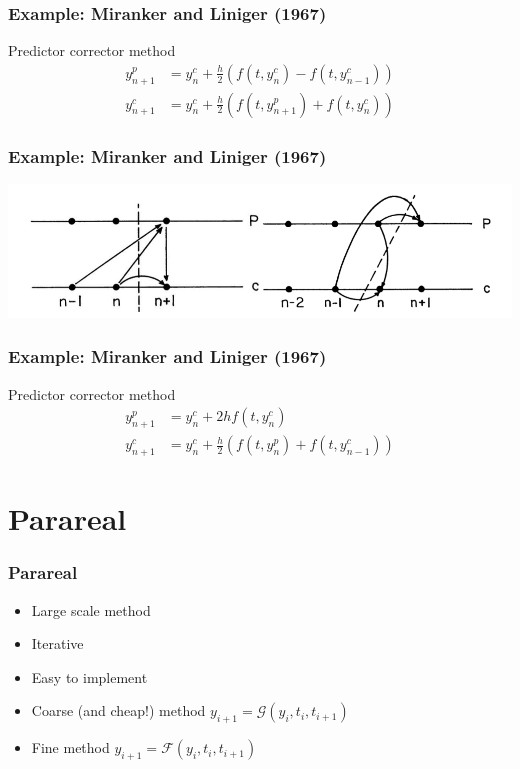 \documentclass[aspectratio=169]{beamer}
\begin{document}
    \begin{frame}
        \frametitle{Example: Miranker and Liniger (1967)}
        Predictor corrector method
        \[\begin{aligned}
            y^p_{n+1} &= y^c_n + \frac{h}{2}(f(t, y^c_n) - f(t, y^c_{n-1}))\\
            y^c_{n+1} &= y_n^c + \frac{h}{2}(f(t, y^p_{n+1}) + f(t, y^c_n))
        \end{aligned}\]
    \end{frame}

    \begin{frame}
        \frametitle{Example: Miranker and Liniger (1967)}
        \includegraphics[width=\textwidth]{Miranker-Liniger.png}
    \end{frame}

    \begin{frame}
        \frametitle{Example: Miranker and Liniger (1967)}
        Predictor corrector method
        \[\begin{aligned}
            y^p_{n+1} &= y^c_n + 2hf(t, y^c_n)\\
            y^c_{n+1} &= y_n^c + \frac{h}{2}(f(t, y^p_{n}) + f(t, y^c_{n-1}))
        \end{aligned}\]
    \end{frame}

    \section{Parareal}
    \begin{frame}
        \frametitle{Parareal}
        \begin{itemize}
            \item Large scale method
            \item Iterative
            \item Easy to implement
            \item Coarse (and cheap!) method $y_{i+1} = \mathcal{G}(y_i, t_i, t_{i+1})$
            \item Fine method $y_{i+1} = \mathcal{F}(y_i, t_i, t_{i+1})$
        \end{itemize}
    \end{frame}
\end{document}
